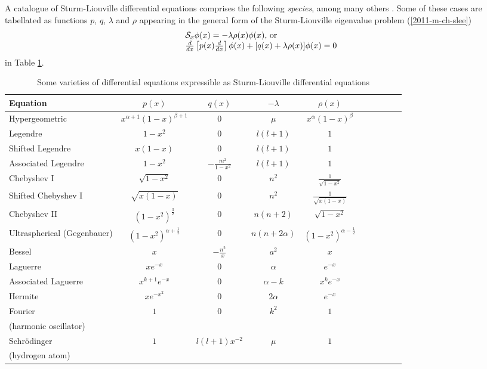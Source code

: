 A catalogue of Sturm-Liouville differential equations
comprises the following {\it species}, among many others \cite{arfken05,Al-Gwaiz,everitt-handbook-sl}.
Some of these cases are
tabellated as functions   $p$, $q$, $\lambda$ and $\rho$ appearing in the general form
of the Sturm-Liouville eigenvalue problem  (\ref{2011-m-ch-slee})
\begin{equation}
\begin{array}  {l}
{\cal S}_{x}    \phi (x) = -\lambda \rho  (x) \phi (x)\textrm{, or } \\
\frac{d}{dx}
\left[
p(x)
\frac{d}{dx}
\right] \phi(x)
+
[q(x)  +   \lambda \rho  (x) ]\phi(x)=0
\end{array}
\end{equation}
in Table \ref{2011-m-sl-t-varieties}.
\begin{table}
{\footnotesize
\begin{tabular}{lccccccccc}
\hline\hline
Equation & $ p(x)$ & $q(x)$ & $-\lambda$ & $\rho (x)$\\
\hline
Hypergeometric  & $x^{\alpha+1}(1-x)^{\beta +1} $ &   $0$ &  $ \mu $ &  $x^{\alpha}(1-x)^{\beta }$
\\
Legendre  & $1-x^2 $ &   $0$ &  $l(l+1) $ &  $1$
\\
Shifted Legendre    & $ x(1-x)$ &   $0$ &  $l(l+1) $ &  $1$
\\
Associated Legendre    & $1-x^2 $ &   $-\frac{m^2}{1-x^2}$ &  $l(l+1) $ &  $1$
\\
Chebyshev I   & $\sqrt{1-x^2} $ &   $0$ &  $n^2 $ &  $ \frac{1}{\sqrt{1-x^2}}$
\\
Shifted Chebyshev I   & $\sqrt{x(1-x)} $ &   $0$ &  $n^2 $ &  $ \frac{1}{\sqrt{x(1-x)}}$
\\
Chebyshev II   & $(1-x^2)^\frac{3}{2} $ &   $0$ &  $n(n+2) $ &  $  \sqrt{1-x^2} $
\\
Ultraspherical (Gegenbauer)   & $(1-x^2)^{\alpha + \frac{1}{2}} $ &   $0$ &  $n(n+2\alpha ) $ &  $  (1-x^2)^{\alpha - \frac{1}{2}}$
\\
Bessel   & $ x$ &   $-\frac{n^2}{x}$ &  $a^2 $ &  $ x$
\\
Laguerre   & $x e^{-x} $ &   $0$ &  $\alpha $ &  $e^{-x} $
\\
Associated Laguerre     & $x^{k+1} e^{-x} $ &   $0$ &  $\alpha -k$ &  $x^ke^{-x} $
\\
Hermite     & $x e^{-x^2} $ &   $0$ &  $2\alpha $ &  $e^{-x} $
\\
Fourier    & $1 $ &   $0$ &  $ k^2 $ &  $1$
\\
(harmonic oscillator)    &   &     &  $  $ &  $ $  \\
Schr\"odinger    & $1 $ &   $l(l+1)x^{-2}$ &  $ \mu $ &  $1$
\\
(hydrogen atom)    &   &     &  $  $ &  $ $  \\
\hline\hline
\end{tabular}
}
\caption{Some varieties of differential equations expressible as Sturm-Liouville differential equations}
\label{2011-m-sl-t-varieties}
\end{table}

